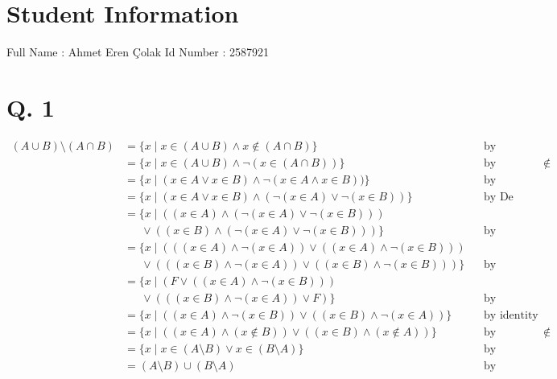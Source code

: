 \documentclass[11pt]{article}
\begin{document}
	\section*{Student Information } 
	Full Name :  Ahmet Eren {\c C}olak \newline
	Id Number :  2587921 

	\section*{Q. 1}
	\begin{center}
		\begin{align*}
			(A \cup B) \setminus (A \cap B) &= \{x \mid x \in (A \cup B) \wedge x \notin (A \cap B)\} && \text{by definiton of set difference}\\
			&= \{x \mid x \in (A \cup B) \wedge \neg (x \in (A \cap B))\} && \text{by definiton of $\notin$}\\
			&= \{x \mid (x \in A \vee x \in B) \wedge \neg (x \in A \wedge x \in B))\} && \text{by definition of set union} \\
			&= \{x \mid (x \in A \vee x \in B) \wedge (\neg (x \in A) \vee \neg (x \in B))\} && \text{by De Morgan's law}\\
			&= \{x \mid ((x \in A) \wedge (\neg (x \in A) \vee \neg (x \in B)))\\
			&\quad \ \; \vee ((x \in B) \wedge (\neg (x \in A) \vee \neg (x \in B)))\} && \text{by distributive laws} \\
			&= \{x \mid (((x \in A) \wedge \neg (x \in A)) \vee ((x \in A) \wedge \neg (x \in B))) \\ 
			&\quad \ \; \vee (((x \in B) \wedge \neg (x \in A)) \vee ((x \in B) \wedge \neg (x \in B)))\} && \text{by distributive laws}\\
			&= \{x \mid (F \vee ((x \in A) \wedge \neg (x \in B)))\\ 
			&\quad \ \; \vee (((x \in B) \wedge \neg (x \in A)) \vee F)\} && \text{by complement laws}\\
			&= \{x \mid ((x \in A) \wedge \neg (x \in B)) \vee ((x \in B) \wedge \neg (x \in A))\} && \text{by identity laws}\\
			&= \{x \mid ((x \in A) \wedge  (x \notin B)) \vee ((x \in B) \wedge (x \notin A))\} && \text{by definiton of $\notin$}\\
			&= \{x \mid x \in (A \setminus B) \vee x \in (B \setminus A)\} && \text{by definiton of set difference}\\
			&= (A \setminus B) \cup (B \setminus A) && \text{by definition of set union}
		\end{align*}
	\end{center}
	
\end{document}
